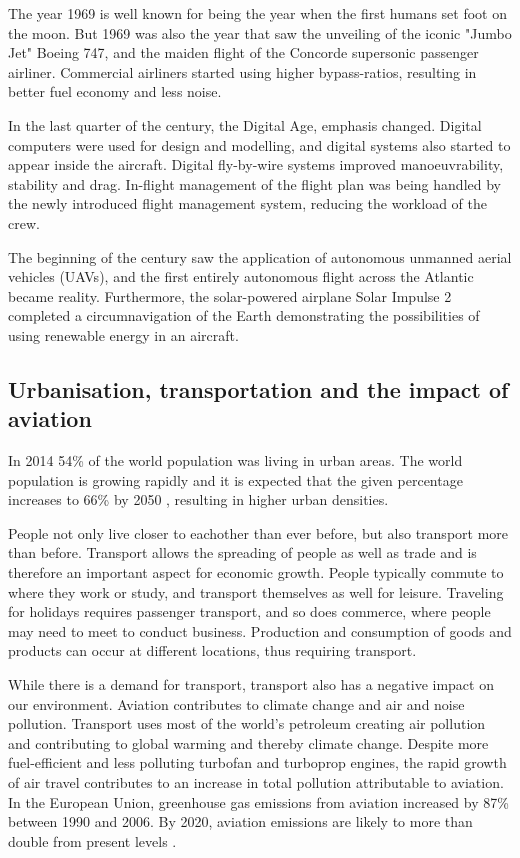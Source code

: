 The year 1969 is well known for being the year when the first humans set foot on
the moon. But 1969 was also the year that saw the unveiling of the iconic "Jumbo
Jet" Boeing 747, and the maiden flight of the Concorde supersonic passenger
airliner. Commercial airliners started using higher bypass-ratios, resulting in
better fuel economy and less noise. %

In the last quarter of the  century, the Digital Age, emphasis changed.
Digital computers were used for design and modelling, and digital systems also
started to appear inside the aircraft. Digital fly-by-wire systems improved
manoeuvrability, stability and drag. In-flight management of the flight plan was
being handled by the newly introduced flight management system, reducing the
workload of the crew.

The beginning of the  century saw the application of autonomous unmanned
aerial vehicles (UAVs), and the first entirely autonomous flight across the
Atlantic became reality. Furthermore, the solar-powered airplane Solar Impulse 2
completed a circumnavigation of the Earth demonstrating the possibilities of
using renewable energy in an aircraft.

\subsection*{Urbanisation, transportation and the impact of aviation}
In 2014 54\% of the world population was living in urban areas. %
The world population is growing rapidly and it is expected that the given
percentage increases to 66\% by 2050 \cite{UnitedNations2014}, resulting
in higher urban densities.

People not only live closer to eachother than ever before, but also transport
more than before. Transport allows the spreading of people as well as trade and
is therefore an important aspect for economic growth. People typically commute
to where they work or study, and transport themselves as well for leisure.
Traveling for holidays requires passenger transport, and so does commerce, where
people may need to meet to conduct business. Production and consumption of goods
and products can occur at different locations, thus requiring transport.

While there is a demand for transport, transport also has a negative impact on
our environment. Aviation contributes to climate change and air and noise
pollution. Transport uses most of the world's petroleum creating air pollution
and contributing to global warming and thereby climate change. Despite more
fuel-efficient and less polluting turbofan and turboprop engines, the rapid
growth of air travel contributes to an increase in total pollution attributable
to aviation. In the European Union, greenhouse gas emissions from aviation
increased by 87\% between 1990 and 2006. By 2020, aviation emissions are likely
to more than double from present levels \cite{European2006}.

